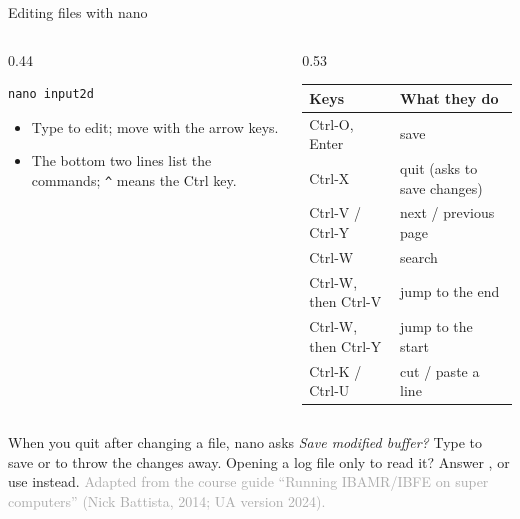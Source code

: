 \documentclass[aspectratio=169,11pt]{beamer}
\newcommand{\sourcecredit}[1]{\vfill\hfill{\tiny\textcolor{DarkGray}{#1}}}
\begin{document}
\begin{frame}[fragile]{Editing files with nano}
\begin{columns}[T,onlytextwidth]
\begin{column}{0.44\textwidth}
\begin{lstlisting}[style=shell]
nano input2d
\end{lstlisting}
\begin{itemize}\small
  \item Type to edit; move with the arrow keys.
  \item The bottom two lines list the commands; \verb|^| means the Ctrl key.
\end{itemize}
\end{column}
\begin{column}{0.53\textwidth}
\footnotesize
\begin{tabular}{@{}ll@{}}
\toprule
Keys & What they do \\
\midrule
Ctrl-O, Enter & save \\
Ctrl-X & quit (asks to save changes) \\
Ctrl-V / Ctrl-Y & next / previous page \\
Ctrl-W & search \\
Ctrl-W, then Ctrl-V & jump to the end \\
Ctrl-W, then Ctrl-Y & jump to the start \\
Ctrl-K / Ctrl-U & cut / paste a line \\
\bottomrule
\end{tabular}
\end{column}
\end{columns}
\vspace{3mm}
\small When you quit after changing a file, nano asks \emph{Save modified buffer?} Type  to save or  to throw the changes away. Opening a log file only to read it? Answer , or use  instead.
\sourcecredit{Adapted from the course guide ``Running IBAMR/IBFE on super computers'' (Nick Battista, 2014; UA version 2024).}
\end{frame}
\end{document}
